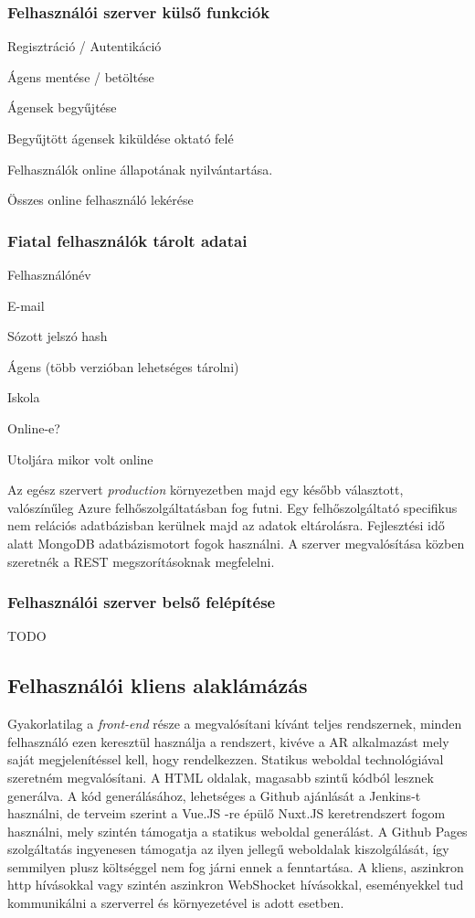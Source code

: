 \documentclass[12pt,a4paper,oneside]{report} %
\begin{document}
\subsubsection{Felhasználói szerver külső funkciók}
\begin{compactitem}
	\item Regisztráció / Autentikáció
	\item Ágens mentése / betöltése
	\item Ágensek begyűjtése
	\item Begyűjtött ágensek kiküldése oktató felé
	\item Felhasználók online állapotának nyilvántartása.
	\item Összes online felhasználó lekérése
\end{compactitem}
\subsubsection{Fiatal felhasználók tárolt adatai}
\begin{compactitem}
	\item Felhasználónév
	\item E-mail
	\item Sózott jelszó hash
	\item Ágens (több verzióban lehetséges tárolni)
	\item Iskola
	\item Online-e?
	\item Utoljára mikor volt online
\end{compactitem}
Az egész szervert \textit{production} környezetben majd egy később választott, valószínűleg Azure felhőszolgáltatásban fog futni. Egy felhőszolgáltató specifikus nem relációs adatbázisban  kerülnek majd az adatok eltárolásra. Fejlesztési idő alatt MongoDB adatbázismotort fogok használni.
A szerver megvalósítása közben szeretnék  a REST megszorításoknak megfelelni.
\subsubsection{Felhasználói szerver belső felépítése}
TODO

\subsection{Felhasználói kliens alaklámázás}
\label{felhkliens}
Gyakorlatilag a \textit{front-end} része a megvalósítani kívánt teljes rendszernek, minden felhasználó ezen keresztül használja a rendszert, kivéve a AR alkalmazást mely saját megjelenítéssel kell, hogy rendelkezzen.
Statikus weboldal technológiával szeretném megvalósítani. A HTML oldalak, magasabb szintű kódból lesznek generálva. A kód generálásához, lehetséges a Github ajánlását a Jenkins-t használni, de terveim szerint a Vue.JS -re épülő Nuxt.JS keretrendszert fogom használni, mely szintén támogatja a statikus weboldal generálást. A Github Pages szolgáltatás ingyenesen támogatja az ilyen jellegű weboldalak kiszolgálását, így semmilyen plusz költséggel nem fog járni ennek a fenntartása. A kliens, aszinkron http hívásokkal vagy szintén aszinkron WebShocket hívásokkal, eseményekkel tud kommunikálni a szerverrel és környezetével is adott esetben.
\end{document}
